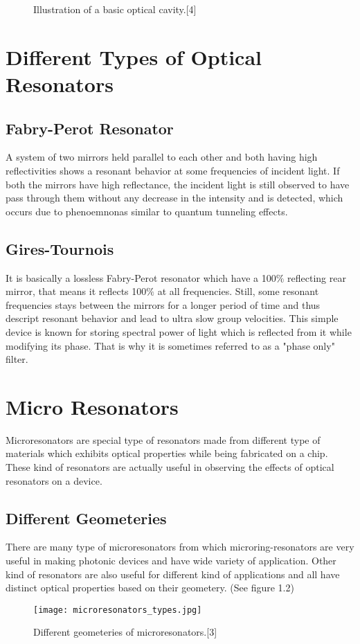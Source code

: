 \begin{figure}[h]
\centering
{}
\caption{Illustration of a basic optical cavity.[4]}
\end{figure}

\newpage
\section{Different Types of Optical Resonators}
\subsection{Fabry-Perot Resonator}
A system of two mirrors held parallel to each other and both having high reflectivities shows a resonant behavior at some frequencies of incident light. If both the mirrors have high reflectance, the incident light is still observed to have pass through them without any decrease in the intensity and is detected, which occurs due to phenoemnonas similar to quantum tunneling effects.

\subsection{Gires-Tournois}
It is basically a lossless Fabry-Perot resonator which have a 100$\%$ reflecting rear mirror, that means it reflects 100$\%$ at all frequencies. Still, some resonant frequencies stays between the mirrors for a longer period of time and thus descript resonant behavior and lead to ultra slow group velocities. This simple device is known for storing spectral power of light which is reflected from it while modifying its phase. That is why it is sometimes referred to as a "phase only" filter.


\section{Micro Resonators}
Microresonators are special type of resonators made from different type of materials which exhibits optical properties while being fabricated on a chip. These kind of resonators are actually useful in observing the effects of optical resonators on a device.
\subsection{Different Geometeries}
There are many type of microresonators from which microring-resonators are very useful in making photonic devices and have wide variety of application. Other kind of resonators are also useful for different kind of applications and all have distinct optical properties based on their geometery. (See figure 1.2)
\begin{figure}[h]
\centering
\texttt{[image: microresonators\_types.jpg]}
\caption{Different geometeries of microresonators.[3]}
\end{figure}

